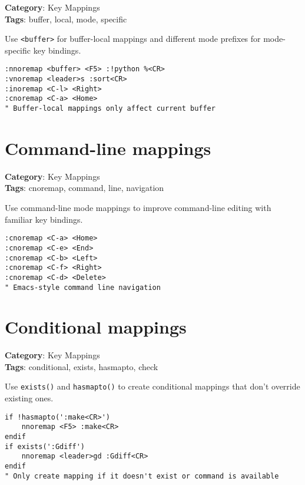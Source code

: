 \textbf{Category}: Key Mappings\\ \textbf{Tags}: buffer, local, mode, specific
\vspace{0.5cm}

Use {\footnotesize \Verb§<buffer>§} for buffer-local mappings and different mode prefixes for mode-specific key bindings.

\begin{Exa*}{}
\begin{Verbatim}[fontsize=\footnotesize, breaklines, breakanywhere]
:nnoremap <buffer> <F5> :!python %<CR>
:vnoremap <leader>s :sort<CR>
:inoremap <C-l> <Right>
:cnoremap <C-a> <Home>
" Buffer-local mappings only affect current buffer
\end{Verbatim}
\end{Exa*}

\section{Command-line mappings}

\textbf{Category}: Key Mappings\\ \textbf{Tags}: cnoremap, command, line, navigation
\vspace{0.5cm}

Use command-line mode mappings to improve command-line editing with familiar key bindings.

\begin{Exa*}{}
\begin{Verbatim}[fontsize=\footnotesize, breaklines, breakanywhere]
:cnoremap <C-a> <Home>
:cnoremap <C-e> <End>
:cnoremap <C-b> <Left>
:cnoremap <C-f> <Right>
:cnoremap <C-d> <Delete>
" Emacs-style command line navigation
\end{Verbatim}
\end{Exa*}

\section{Conditional mappings}

\textbf{Category}: Key Mappings\\ \textbf{Tags}: conditional, exists, hasmapto, check
\vspace{0.5cm}

Use {\footnotesize \Verb§exists()§} and {\footnotesize \Verb§hasmapto()§} to create conditional mappings that don't override existing ones.

\begin{Exa*}{}
\begin{Verbatim}[fontsize=\footnotesize, breaklines, breakanywhere]
if !hasmapto(':make<CR>')
    nnoremap <F5> :make<CR>
endif
if exists(':Gdiff')
    nnoremap <leader>gd :Gdiff<CR>
endif
" Only create mapping if it doesn't exist or command is available
\end{Verbatim}
\end{Exa*}

